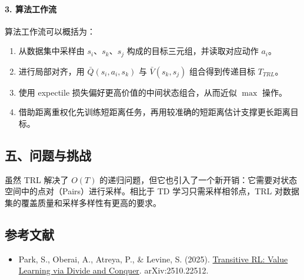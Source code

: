 \hypertarget{ux7b97ux6cd5ux5de5ux4f5cux6d41}{%
\paragraph{3. 算法工作流}\label{ux7b97ux6cd5ux5de5ux4f5cux6d41}}

算法工作流可以概括为：

\begin{enumerate}
\def\labelenumi{\arabic{enumi}.}
\tightlist
\item
  从数据集中采样由 \(s_i\)、\(s_k\)、\(s_j\) 构成的目标三元组，并读取对应动作 \(a_i\)。
\item
  进行局部对齐，用 \(\bar{Q}(s_i,a_i,s_k)\) 与 \(\bar{V}(s_k,s_j)\) 组合得到传递目标 \(T_{TRL}\)。
\item
  使用 expectile 损失偏好更高价值的中间状态组合，从而近似 \(\max\) 操作。
\item
  借助距离重权化先训练短距离任务，再用较准确的短距离估计支撑更长距离目标。
\end{enumerate}

\hypertarget{ux4e94ux95eeux9898ux4e0eux6311ux6218}{%
\subsection{五、问题与挑战}\label{ux4e94ux95eeux9898ux4e0eux6311ux6218}}

虽然 TRL 解决了 \(O(T)\) 的递归问题，但它也引入了一个新开销：它需要对状态空间中的点对（Pairs）进行采样。相比于 TD 学习只需采样相邻点，TRL 对数据集的覆盖质量和采样多样性有更高的要求。

\hypertarget{ux53c2ux8003ux6587ux732e-65}{%
\subsection{参考文献}\label{ux53c2ux8003ux6587ux732e-65}}

\begin{itemize}
\tightlist
\item
  Park, S., Oberai, A., Atreya, P., \& Levine, S. (2025). \href{https://arxiv.org/abs/2510.22512}{Transitive RL: Value Learning via Divide and Conquer}. arXiv:2510.22512.
\end{itemize}

\clearpage
